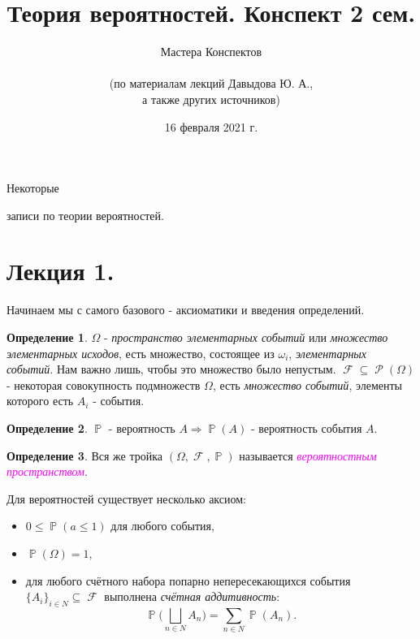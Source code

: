 \documentclass[a4paper,100pt]{article}
\title{Теория вероятностей. Конспект 2 сем.}
\author{Мастера Конспектов\\ \\ (по материалам лекций Давыдова Ю. А.,\\ а также других источников)}
\date{16 февраля 2021 г.}
\theoremstyle{indented}
\theoremstyle{definition}
\newtheorem{defn}{Определение}
\theoremstyle{remark}
\DeclareMathOperator{\PP}{\mathbb{P}}
\DeclareMathOperator{\FF}{\mathcal{F}}
\DeclareMathOperator{\Rho}{\mathcal{P}}
\begin{document}
\newcommand{\resetexlcounters}{%
  \setcounter{exl}{0}%
} 

\newcommand{\resetremarkcounters}{%
  \setcounter{remark}{0}%
} 

\newcommand{\reseconscounters}{%
  \setcounter{cons}{0}%
} 

\newcommand{\resetall}{%
    \resetexlcounters
    \resetremarkcounters
    \reseconscounters%
}

\maketitle 

\newpage

\hypertarget{t1}{Некоторые} записи по теории вероятностей.
\tableofcontents

\newpage


\section{Лекция 1.}

Начинаем мы с самого базового - аксиоматики и введения определений.

\begin{defn}
    $\Omega$ - \textit{пространство элементарных событий} или \textit{множество элементарных исходов}, есть множество, состоящее из $\omega_i$, \textit{элементарных событий}. Нам важно лишь, чтобы это множество было непустым. $\FF\subseteq \Rho(\Omega)$ - некоторая совокупность подмножеств $\Omega$, есть \textit{множество событий}, элементы которого есть $A_i$ - события.
\end{defn}

\begin{defn}
    $\PP$ - вероятность $A\Rightarrow \PP(A)$ - вероятность события $A$.
\end{defn}

\begin{defn}
    Вся же тройка $(\Omega, \FF, \PP)$ называется \hypertarget{n1}{\textcolor{magenta}{\textit{вероятностным пространством}}}.
\end{defn}

Для вероятностей существует несколько аксиом: 

\begin{itemize}
    \item $0\leq \PP(a\leq 1)$ для любого события, 
    \item $\PP(\Omega)=1$, 
    \item для любого счётного набора попарно непересекающихся события $\{A_i\}_{i\in N}\subseteq\FF$ выполнена \textit{счётная аддитивность}:
    \[
        \PP\biggl( \bigsqcup_{n\in N} A_n\biggr)=\sum_{n\in N}\PP(A_n).
    \]
\end{itemize}
\end{document}
